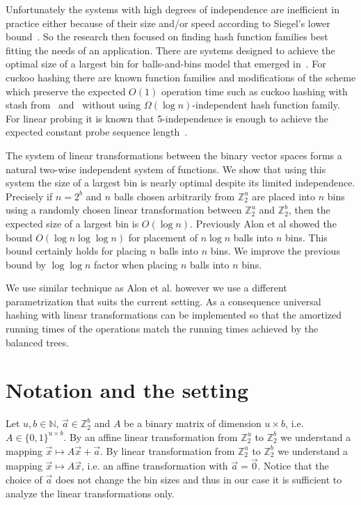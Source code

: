 \documentclass[unicode,review]{siamart1116}
\newcommand{\vecspace}[2]{\mathbb{Z}_{#1}^{#2}}
\newcommand{\binvecspace}[1]{\vecspace{2}{#1}}
\numberwithin{theorem}{section}
\begin{document}
Unfortunately the systems with high degrees of independence are inefficient in practice either because of their size and/or speed according to Siegel's lower bound~\cite{siegel}. 
So the research then focused on finding hash function families best fitting the needs of an application. 
There are systems designed to achieve the optimal size of a largest bin for balls-and-bins model that emerged in~\cite{celisetal}.
For cuckoo hashing there are known function families and modifications of the scheme which preserve the expected $O(1)$ operation time such as cuckoo hashing with stash from~\cite{mitzenmacher-cuckoo} and~\cite{dietzfelbinger-cuckoo} without using $\Omega(\log n)$-independent hash function family.
For linear probing it is known that 5-independence is enough to achieve the expected constant probe sequence length~\cite{linear-probing}.

The system of linear transformations between the binary vector spaces forms a natural two-wise independent system of functions.
We show that using this system the size of a largest bin is nearly optimal despite its limited independence.
Precisely if $n = 2^b$ and $n$ balls chosen arbitrarily from $\binvecspace{u}$ are placed into $n$ bins using a randomly chosen linear transformation between $\binvecspace{u}$ and $\binvecspace{b}$, then the expected size of a largest bin is $O(\log n)$.
Previously Alon et al \cite{alonetal} showed the bound $O(\log n \log \log n)$ for placement of $n \log n$ balls into $n$ bins.
This bound certainly holds for placing $n$ balls into $n$ bins.
We improve the previous bound by $\log \log n$ factor when placing $n$ balls into $n$ bins.

We use similar technique as Alon et al. however we use a different parametrization that suits the current setting. As a consequence universal hashing with linear transformations can be implemented so that the amortized running times of the operations match the running times achieved by the balanced trees.

\section{Notation and the setting}
Let $u, b \in \mathbb{N}$, $\vec{a} \in \binvecspace{b}$ and $A$ be a binary matrix of dimension $u \times b$, i.e. $A \in \{0, 1\}^{u \times b}$.
By an affine linear transformation from $\binvecspace{u}$ to $\binvecspace{b}$ we understand a mapping $\vec x \mapsto A\vec x + \vec{a}$.
By linear transformation from $\binvecspace{u}$ to $\binvecspace{b}$
we understand a mapping $\vec x \mapsto A\vec x$, i.e. an affine transformation with $\vec{a} = \vec{0}$.
Notice that the choice of $\vec{a}$ does not change the bin sizes and thus in our case it is sufficient to analyze the linear transformations only.
\end{document}

